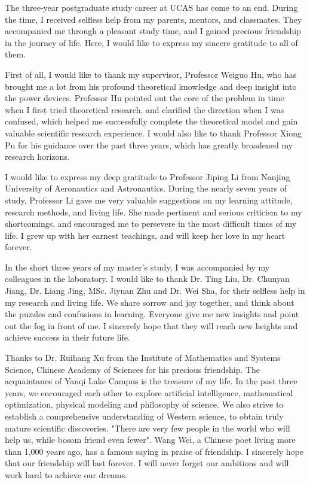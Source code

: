 
\begin{acknowledgements}

The three-year postgraduate study career at UCAS has come to an end. During the time, I received selfless help from my parents, mentors, and classmates. They accompanied me through a pleasant study time, and I gained precious friendship in the journey of life. Here, I would like to express my sincere gratitude to all of them.

First of all, I would like to thank my supervisor, Professor Weiguo Hu, who has brought me a lot from his profound theoretical knowledge and deep insight into the power devices. Professor Hu pointed out the core of the problem in time when I first tried theoretical research, and clarified the direction when I was confused, which helped me successfully complete the theoretical model and gain valuable scientific research experience. I would also like to thank Professor Xiong Pu for his guidance over the past three years, which has greatly broadened my research horizons. 

I would like to express my deep gratitude to Professor Jiping Li from Nanjing University of Aeronautics and Astronautics. During the nearly seven years of study, Professor Li gave me very valuable suggestions on my learning attitude, research methods, and living life. She made pertinent and serious criticism to my shortcomings, and encouraged me to persevere in the most difficult times of my life. I grew up with her earnest teachings, and will keep her love in my heart forever.

In the short three years of my master's study, I was accompanied by my colleagues in the laboratory. I would like to thank Dr. Ting Liu, Dr. Chunyan Jiang, Dr. Liang Jing, MSc. Jiyuan Zhu and Dr. Wei Sha, for their selfless help in my research and living life. We share sorrow and joy together, and think about the puzzles and confusions in learning. Everyone give me new insights and point out the fog in front of me. I sincerely hope that they will reach new heights and achieve success in their future life.

Thanks to Dr. Ruihang Xu from the Institute of Mathematics and Systems Science, Chinese Academy of Sciences for his precious friendship. The acquaintance of Yanqi Lake Campus is the treasure of my life. In the past three years, we encouraged each other to explore artificial intelligence, mathematical optimization, physical modeling and philosophy of science. We also strive to establish a comprehensive understanding of Western science, to obtain truly mature scientific discoveries. "There are very few people in the world who will help us, while bosom friend even fewer". Wang Wei, a Chinese poet living more than 1,000 years ago, has a famous saying in praise of friendship. I sincerely hope that our friendship will last forever. I will never forget our ambitions and will work hard to achieve our dreams.


\end{acknowledgements}
